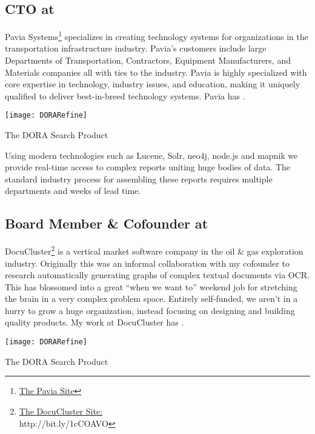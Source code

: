 \subsection{\textbf{CTO} at  \shyears{[2015-PRESENT]}}
Pavia Systems\footnote{\href{http://www.paviasystems.com/}{The Pavia Site}} specializes in creating technology systems for organizations in the transportation infrastructure industry.  Pavia’s customers include large Departments of Transportation, Contractors, Equipment Manufacturers, and Materials companies all with ties to the industry.  Pavia is highly specialized with core expertise in technology, industry issues, and education, making it uniquely qualified to deliver best-in-breed technology systems.  Pavia has .
\begin{marginfigure}%
  \texttt{[image: DORARefine]}
  \caption{The DORA Search Product}
  \label{fig:DoraProduct}
\end{marginfigure}

Using modern technologies such as Lucene, Solr, neo4j, node.js and mapnik we provide real-time access to complex reports uniting huge bodies of data.  The standard industry process for assembling these reports requires multiple departments and weeks of lead time.

\subsection{\textbf{Board Member \& Cofounder} at  \shyears{[2011-PRESENT]}}
DocuCluster\footnote{\href{http://www.docucluster.com/}{The DocuCluster Site:}\\http://bit.ly/1cCOAVO} is a vertical market software company in the oil \& gas exploration industry.  Originally this was an informal collaboration with my cofounder to research automatically generating graphs of complex textual documents via OCR.  This has blossomed into a great ``when we want to'' weekend job for stretching the brain in a very complex problem space.  Entirely self-funded, we aren't in a hurry to grow a huge organization, instead focusing on designing and building quality products.  My work at DocuCluster has .
\begin{marginfigure}%
  \texttt{[image: DORARefine]}
  \caption{The DORA Search Product}
  \label{fig:DoraProduct}
\end{marginfigure}

